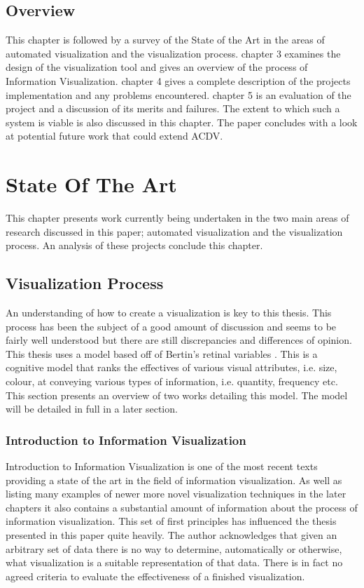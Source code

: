 \documentclass[a4paper, 11pt, titlepage, onehalfspacing]{report}
\begin{document}
	\section{Overview}
 
This chapter is followed by a survey of the State of the Art in the areas of automated visualization and the visualization process. chapter 3 examines the design of the visualization tool and gives an overview of the process of Information Visualization. chapter 4 gives a complete description of the projects implementation and any problems encountered. chapter 5 is an evaluation of the project and a discussion of its merits and failures. The extent to which such a system is viable is also discussed in this chapter. The paper concludes with a look at potential future work that could extend AC\lightning{}DV.


	\chapter{State Of The Art}

This chapter presents work currently being undertaken in the two main areas of research discussed in this paper; automated visualization and the visualization process. An analysis of these projects conclude this chapter.

	\section{Visualization Process}
An understanding of how to create a visualization is key to this thesis. This process has been the subject of a good amount of discussion and seems to be fairly well understood but there are still discrepancies and differences of opinion. This thesis uses a model based off of Bertin's retinal variables \cite{bertin1973semiologie}. This is a cognitive model that ranks the effectives of various visual attributes, i.e. size, colour, at conveying various types of information, i.e. quantity, frequency etc. This section presents an overview of two works detailing this model. The model will be detailed in full in a later section.


		\subsection{Introduction to Information Visualization}
Introduction to Information Visualization \cite{mazza2009introduction} is one of the most recent texts providing a state of the art in the field of information visualization. As well as listing many examples of newer more novel visualization techniques in the later chapters it also contains a substantial amount of information about the process of information visualization. This set of first principles has influenced the thesis presented in this paper quite heavily. The author acknowledges that given an arbitrary set of data there is no way to determine, automatically or otherwise, what visualization is a suitable representation of that data. There is in fact no agreed criteria to evaluate the effectiveness of a finished visualization.
\end{document}
